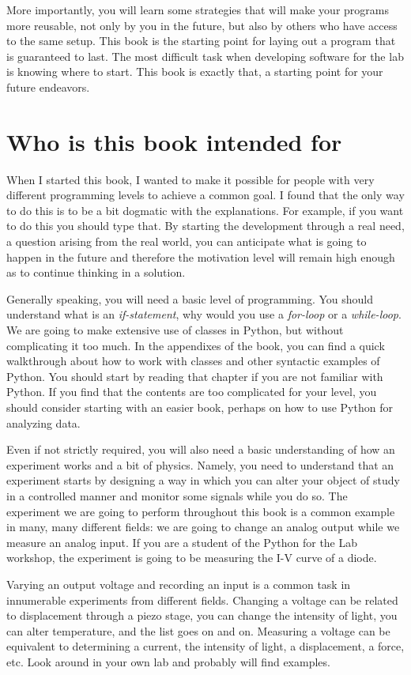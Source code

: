 More importantly, you will learn some strategies that will make your programs more reusable, not only by you in the future, but also by others who have access to the same setup. This book is the starting point for laying out a program that is guaranteed to last. The most difficult task when developing software for the lab is knowing where to start. This book is exactly that, a starting point for your future endeavors.

\section{Who is this book intended for}
When I started this book, I wanted to make it possible for people with very different programming levels to achieve a common goal. I found that the only way to do this is to be a bit dogmatic with the explanations. For example, if you want to do this you should type that. By starting the development through a real need, a question arising from the real world, you can anticipate what is going to happen in the future and therefore the motivation level will remain high enough as to continue thinking in a solution.

Generally speaking, you will need a basic level of programming. You should understand what is an \textit{if-statement}, why would you use a \textit{for-loop} or a \textit{while-loop}. We are going to make extensive use of classes in Python, but without complicating it too much. In the appendixes of the book, you can find a quick walkthrough about how to work with classes and other syntactic examples of Python. You should start by reading that chapter if you are not familiar with Python. If you find that the contents are too complicated for your level, you should consider starting with an easier book, perhaps on how to use Python for analyzing data.

Even if not strictly required, you will also need a basic understanding of how an experiment works and a bit of physics. Namely, you need to understand that an experiment starts by designing a way in which you can alter your object of study in a controlled manner and monitor some signals while you do so. The experiment we are going to perform throughout this book is a common example in many, many different fields: we are going to change an analog output while we measure an analog input. If you are a student of the Python for the Lab workshop, the experiment is going to be measuring the I-V curve of a diode.

Varying an output voltage and recording an input is a common task in innumerable experiments from different fields. Changing a voltage can be related to displacement through a piezo stage, you can change the intensity of light, you can alter temperature, and the list goes on and on. Measuring a voltage can be equivalent to determining a current, the intensity of light, a displacement, a force, etc. Look around in your own lab and probably will find examples.

